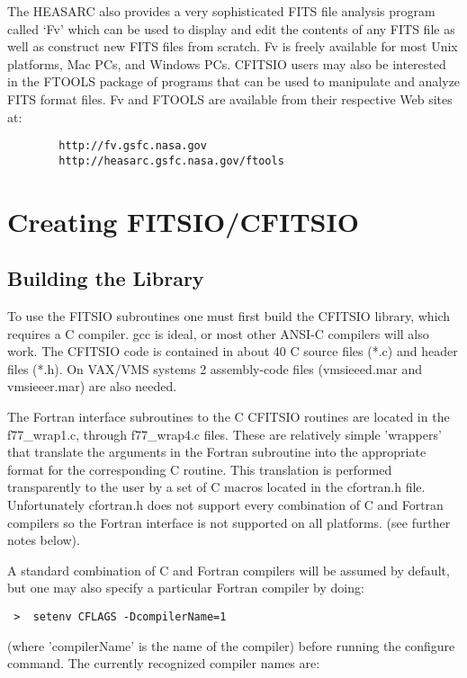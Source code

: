 \documentclass[11pt]{book}
\begin{document}
The HEASARC also provides a very sophisticated FITS file analysis
program called `Fv' which can be used to display and edit the contents
of any FITS file as well as construct new FITS files from scratch.
Fv is freely available for
most Unix platforms, Mac PCs, and Windows PCs.
CFITSIO users may also be interested in the FTOOLS package of programs
that can be used to manipulate and analyze FITS format files.
Fv and FTOOLS are available from their respective Web sites at:

\begin{verbatim}
        http://fv.gsfc.nasa.gov
        http://heasarc.gsfc.nasa.gov/ftools
\end{verbatim}


\chapter{ Creating FITSIO/CFITSIO }


\section{Building the Library}

To use the FITSIO subroutines one must first build the CFITSIO library,
which requires a C compiler. gcc is ideal, or most other ANSI-C
compilers will also work.  The CFITSIO code is contained in about 40 C
source files (*.c) and header files (*.h). On VAX/VMS systems 2
assembly-code files (vmsieeed.mar and vmsieeer.mar) are also needed.

The Fortran interface subroutines to the C CFITSIO routines are located
in the f77\_wrap1.c, through f77\_wrap4.c files.  These are relatively simple
'wrappers' that translate the arguments in the Fortran subroutine into
the appropriate format for the corresponding C routine.  This
translation is performed transparently to the user by a set of C macros
located in the cfortran.h file.  Unfortunately cfortran.h does not
support every combination of C and Fortran compilers so the Fortran
interface is not supported on all platforms. (see further notes below).

A standard combination of C and Fortran compilers will be assumed by
default, but one may also specify a particular Fortran compiler by
doing:

\begin{verbatim}
 >  setenv CFLAGS -DcompilerName=1
\end{verbatim}
(where 'compilerName' is the name of the compiler) before running
the configure command.  The currently recognized compiler
names are:
\end{document}
